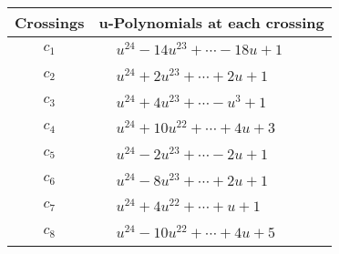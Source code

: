 \documentclass[1p]{elsarticle_modified}
\theoremstyle{definition}
\begin{document}
\begin{tabular}{m{50pt}|m{274pt}}
Crossings & \hspace{64pt}u-Polynomials at each crossing \\
\hline $$\begin{aligned}c_{1}\end{aligned}$$&$\begin{aligned}
&u^{24}-14 u^{23}+\cdots-18 u+1
\end{aligned}$\\
\hline $$\begin{aligned}c_{2}\end{aligned}$$&$\begin{aligned}
&u^{24}+2 u^{23}+\cdots+2 u+1
\end{aligned}$\\
\hline $$\begin{aligned}c_{3}\end{aligned}$$&$\begin{aligned}
&u^{24}+4 u^{23}+\cdots- u^3+1
\end{aligned}$\\
\hline $$\begin{aligned}c_{4}\end{aligned}$$&$\begin{aligned}
&u^{24}+10 u^{22}+\cdots+4 u+3
\end{aligned}$\\
\hline $$\begin{aligned}c_{5}\end{aligned}$$&$\begin{aligned}
&u^{24}-2 u^{23}+\cdots-2 u+1
\end{aligned}$\\
\hline $$\begin{aligned}c_{6}\end{aligned}$$&$\begin{aligned}
&u^{24}-8 u^{23}+\cdots+2 u+1
\end{aligned}$\\
\hline $$\begin{aligned}c_{7}\end{aligned}$$&$\begin{aligned}
&u^{24}+4 u^{22}+\cdots+u+1
\end{aligned}$\\
\hline $$\begin{aligned}c_{8}\end{aligned}$$&$\begin{aligned}
&u^{24}-10 u^{22}+\cdots+4 u+5
\end{aligned}$\\

\end{tabular}
\end{document}
